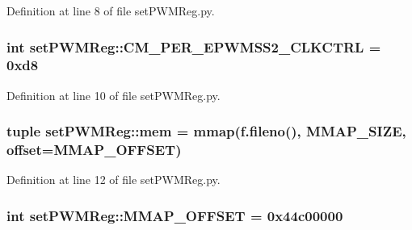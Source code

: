 \-Definition at line 8 of file set\-P\-W\-M\-Reg.\-py.

\hypertarget{namespaceset_p_w_m_reg_a98401dab9ef3fd3cd91cbe23a595e589}{
\subsubsection[{\-C\-M\-\_\-\-P\-E\-R\-\_\-\-E\-P\-W\-M\-S\-S2\-\_\-\-C\-L\-K\-C\-T\-R\-L}]{\setlength{\rightskip}{0pt plus 5cm}int {\bf set\-P\-W\-M\-Reg\-::\-C\-M\-\_\-\-P\-E\-R\-\_\-\-E\-P\-W\-M\-S\-S2\-\_\-\-C\-L\-K\-C\-T\-R\-L} = 0xd8}}\label{namespaceset_p_w_m_reg_a98401dab9ef3fd3cd91cbe23a595e589}


\-Definition at line 10 of file set\-P\-W\-M\-Reg.\-py.

\hypertarget{namespaceset_p_w_m_reg_a6b375e159326fb3187b384ae323a07aa}{
\subsubsection[{mem}]{\setlength{\rightskip}{0pt plus 5cm}tuple {\bf set\-P\-W\-M\-Reg\-::mem} = mmap(f.\-fileno(), {\bf \-M\-M\-A\-P\-\_\-\-S\-I\-Z\-E}, offset={\bf \-M\-M\-A\-P\-\_\-\-O\-F\-F\-S\-E\-T})}}\label{namespaceset_p_w_m_reg_a6b375e159326fb3187b384ae323a07aa}


\-Definition at line 12 of file set\-P\-W\-M\-Reg.\-py.

\hypertarget{namespaceset_p_w_m_reg_a06a96f5d3655051e8480d21c0fbb628b}{
\subsubsection[{\-M\-M\-A\-P\-\_\-\-O\-F\-F\-S\-E\-T}]{\setlength{\rightskip}{0pt plus 5cm}int {\bf set\-P\-W\-M\-Reg\-::\-M\-M\-A\-P\-\_\-\-O\-F\-F\-S\-E\-T} = 0x44c00000}}\label{namespaceset_p_w_m_reg_a06a96f5d3655051e8480d21c0fbb628b}


